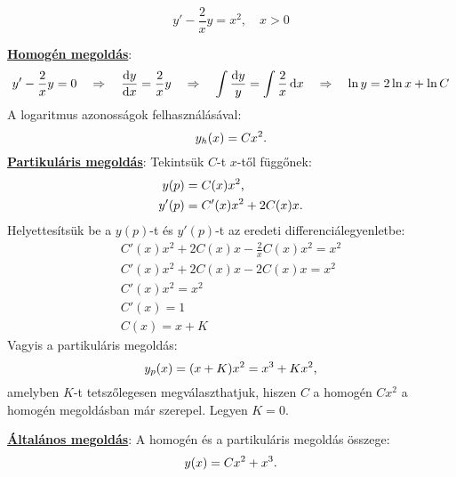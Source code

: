 \begin{example}
  $$
    y' - \frac{2}{x} y = x^2, \quad x > 0
  $$
  \boxrule

  \underline{\textbf{Homogén megoldás}}:
  $$
    y' - \frac{2}{x} y = 0
    \quad \Rightarrow \quad
    \odv{y}{x} = \frac{2}{x} y
    \quad \Rightarrow \quad
    \int\frac{\dd y}{y} = \int\frac{2}{x} \dd x
    \quad \Rightarrow \quad
    \ln y = 2 \ln x + \ln C
  $$
  A logaritmus azonosságok felhasználásával:
  $$
    y_h(x) = C x^2
    \text.
  $$
  \underline{\textbf{Partikuláris megoldás}}: Tekintsük $C$-t $x$-től függőnek:
  \begin{align*}
    y(p)  & = C(x) x^2 \text,             \\
    y'(p) & = C'(x) x^2 + 2 C(x) x \text.
  \end{align*}
  Helyettesítsük be a $y(p)$-t és $y'(p)$-t az eredeti differenciálegyenletbe:
  \begin{gather*}
    C'(x) x^2 + 2 C(x) x - \frac{2}{x} C(x) x^2 = x^2
    \\
    C'(x) x^2 + 2 C(x) x - 2 C(x) x = x^2
    \\
    C'(x) x^2 = x^2
    \\
    C'(x) = 1
    \\
    C(x) = x + K
  \end{gather*}
  Vagyis a partikuláris megoldás:
  $$
    y_p(x) = (x + K) x^2 = x^3 + K x^2
    \text,
  $$
  amelyben $K$-t tetszőlegesen megválaszthatjuk, hiszen $C$ a homogén
  $C x^2$ a homogén megoldásban már szerepel. Legyen $K = 0$.

  \underline{\textbf{Általános megoldás}}:
  A homogén és a partikuláris megoldás összege:
  $$
    y(x) = C x^2 + x^3
    \text.
  $$
\end{example}